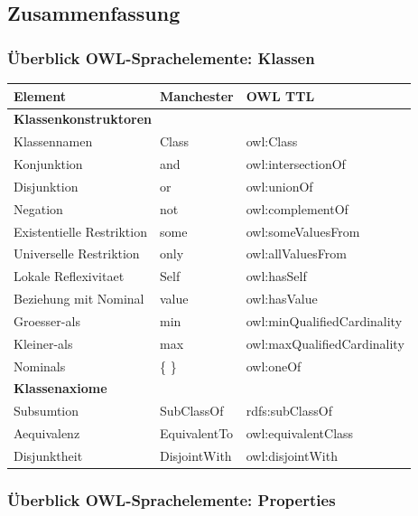 \documentclass[a4paper]{article}
\begin{document}
\subsection{Zusammenfassung}

\subsubsection*{Überblick OWL-Sprachelemente: Klassen}

\begin{center}
    \begin{tabular}{|l|l|l|}
        \hline
        \textbf{Element} & \textbf{Manchester} & \textbf{OWL TTL} \\
        \hline
        \multicolumn{3}{|l|}{\textbf{Klassenkonstruktoren}} \\
        \hline
        Klassennamen & Class & owl:Class \\
        Konjunktion & and & owl:intersectionOf \\
        Disjunktion & or & owl:unionOf \\
        Negation & not & owl:complementOf \\
        Existentielle Restriktion & some & owl:someValuesFrom \\
        Universelle Restriktion & only & owl:allValuesFrom \\
        Lokale Reflexivitaet & Self & owl:hasSelf \\
        Beziehung mit Nominal & value & owl:hasValue \\
        Groesser-als & min & owl:minQualifiedCardinality \\
        Kleiner-als & max & owl:maxQualifiedCardinality \\
        Nominals & \{ \} & owl:oneOf \\
        \hline
        \multicolumn{3}{|l|}{\textbf{Klassenaxiome}} \\
        \hline
        Subsumtion & SubClassOf & rdfs:subClassOf \\
        Aequivalenz & EquivalentTo & owl:equivalentClass \\
        Disjunktheit & DisjointWith & owl:disjointWith \\
        \hline
    \end{tabular}
\end{center}

\subsubsection*{Überblick OWL-Sprachelemente: Properties}
\end{document}
